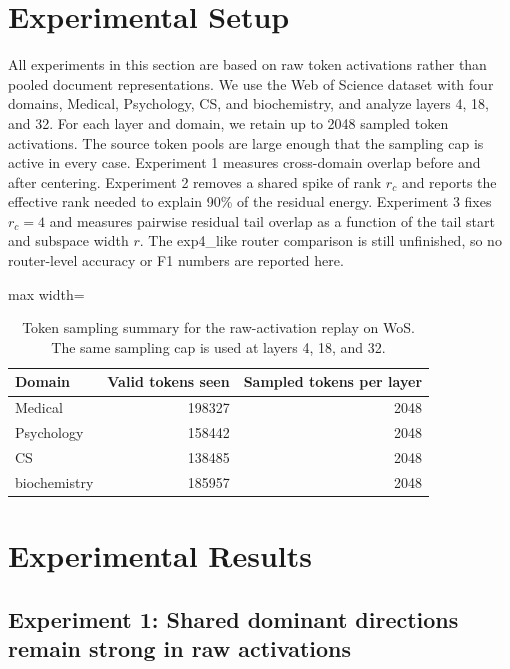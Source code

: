 \documentclass[11pt]{article}
\newcommand{\tablesize}{\footnotesize}
\begin{document}
\section{Experimental Setup}

All experiments in this section are based on raw token activations rather than pooled document representations. We use the Web of Science dataset with four domains, Medical, Psychology, CS, and biochemistry, and analyze layers 4, 18, and 32. For each layer and domain, we retain up to 2048 sampled token activations. The source token pools are large enough that the sampling cap is active in every case. Experiment 1 measures cross-domain overlap before and after centering. Experiment 2 removes a shared spike of rank $r_c$ and reports the effective rank needed to explain 90\% of the residual energy. Experiment 3 fixes $r_c=4$ and measures pairwise residual tail overlap as a function of the tail start and subspace width $r$. The exp4\_like router comparison is still unfinished, so no router-level accuracy or F1 numbers are reported here.

\begin{table}[H]
\centering
\tablesize
\begin{adjustbox}{max width=\linewidth}
\begin{tabular}{lrr}
\toprule
Domain & Valid tokens seen & Sampled tokens per layer \\
\midrule
Medical & 198327 & 2048 \\
Psychology & 158442 & 2048 \\
CS & 138485 & 2048 \\
biochemistry & 185957 & 2048 \\
\bottomrule
\end{tabular}
\end{adjustbox}
\caption{Token sampling summary for the raw-activation replay on WoS. The same sampling cap is used at layers 4, 18, and 32.}
\label{tab:token-summary}
\end{table}

\section{Experimental Results}

\subsection{Experiment 1: Shared dominant directions remain strong in raw activations}
\end{document}
